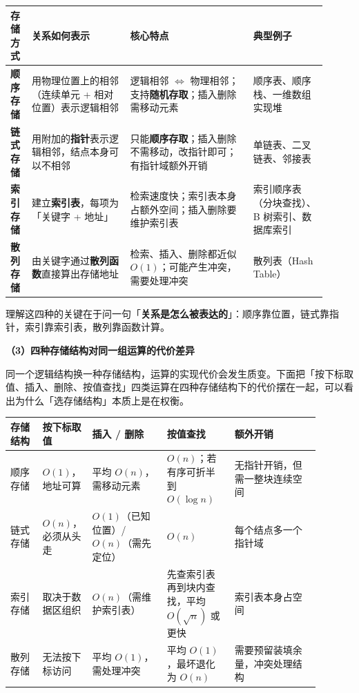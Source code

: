 \documentclass[11pt,openany,UTF8]{ctexbook}
\begin{document}
\begingroup\small\setlength{\tabcolsep}{4.0pt}
\begin{longtable}{@{}L{0.0614\linewidth}L{0.2854\linewidth}L{0.3529\linewidth}L{0.2117\linewidth}@{}}
\toprule
\textbf{存储方式} & \textbf{关系如何表示} & \textbf{核心特点} & \textbf{典型例子} \\
\midrule
\endhead
\textbf{顺序存储} & 用物理位置上的相邻（连续单元 + 相对位置）表示逻辑相邻 & 逻辑相邻 $\Leftrightarrow$ 物理相邻；支持\textbf{随机存取}；插入删除需移动元素 & 顺序表、顺序栈、一维数组实现堆 \\
\textbf{链式存储} & 用附加的\textbf{指针}表示逻辑相邻，结点本身可以不相邻 & 只能\textbf{顺序存取}；插入删除不需移动，改指针即可；有指针域额外开销 & 单链表、二叉链表、邻接表 \\
\textbf{索引存储} & 建立\textbf{索引表}，每项为「关键字 + 地址」 & 检索速度快；索引表本身占额外空间；插入删除要维护索引表 & 索引顺序表（分块查找）、B 树索引、数据库索引 \\
\textbf{散列存储} & 由关键字通过\textbf{散列函数}直接算出存储地址 & 检索、插入、删除都近似 $O(1)$；可能产生冲突，需要处理冲突 & 散列表（Hash Table） \\
\bottomrule
\end{longtable}
\endgroup

理解这四种的关键在于问一句「\textbf{关系是怎么被表达的}」：顺序靠位置，链式靠指针，索引靠索引表，散列靠函数计算。

\textbf{（3）四种存储结构对同一组运算的代价差异}

同一个逻辑结构换一种存储结构，运算的实现代价会发生质变。下面把「按下标取值、插入、删除、按值查找」四类运算在四种存储结构下的代价摆在一起，可以看出为什么「选存储结构」本质上是在权衡。

\begingroup\small\setlength{\tabcolsep}{4.0pt}
\begin{longtable}{@{}L{0.0931\linewidth}L{0.1444\linewidth}L{0.2189\linewidth}L{0.1956\linewidth}L{0.2422\linewidth}@{}}
\toprule
\textbf{存储结构} & \textbf{按下标取值} & \textbf{插入 / 删除} & \textbf{按值查找} & \textbf{额外开销} \\
\midrule
\endhead
顺序存储 & $O(1)$，地址可算 & 平均 $O(n)$，需移动元素 & $O(n)$；若有序可折半到 $O(\log n)$ & 无指针开销，但需一整块连续空间 \\
链式存储 & $O(n)$，必须从头走 & $O(1)$（已知位置）/ $O(n)$（需先定位） & $O(n)$ & 每个结点多一个指针域 \\
索引存储 & 取决于数据区组织 & $O(n)$（需维护索引表） & 先查索引表再到块内查找，平均 $O(\sqrt n)$ 或更快 & 索引表本身占空间 \\
散列存储 & 无法按下标访问 & 平均 $O(1)$，需处理冲突 & 平均 $O(1)$，最坏退化为 $O(n)$ & 需要预留装填余量，冲突处理结构 \\
\bottomrule
\end{longtable}
\endgroup
\end{document}
